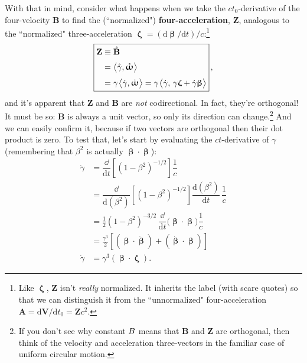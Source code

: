 \documentclass[12pt]{article}
\newcommand{\abs}[1]{\mathnormal \vv{#1}}
\renewcommand{\vv}[1]{\mathbf{#1}}
\newcommand{\dd}[1]{\mathrm{d}#1}
\newcommand{\vvbeta}{\bm{\upbeta}}
\newcommand{\vvomega}{\bm{\upomega}}
\newcommand{\vvzeta}{\bm{\upzeta}}
\begin{document}
With that in mind, consider what happens when we take the $c t_0$-derivative of the four-velocity $\vv B$ to find the (``normalized") \textbf{four-acceleration}, $\vv Z$, analogous to the ``normalized" three-acceleration $\vvzeta=(\dd \vvbeta / \dd t)/c$:\footnote{Like $\vvzeta$, $\vv Z$ isn't \emph{really} normalized. It inherits the label (with scare quotes) so that we can distinguish it from the ``unnormalized" four-acceleration $\vv A = \dd \vv V / \dd t_0 = \vv Z c^2$.}
\begin{equation}\label{eq:34}
\boxed{
\begin{aligned}
\vv Z &\equiv \mathring{\vv B} \\[2pt]
&= \big \langle \mathring{\gamma}, \mathring{\vvomega} \big \rangle \\[3pt]
&= \gamma \mkern1.5mu \big \langle \dot{\gamma}, \dot{\vvomega} \big \rangle = \gamma \mkern1.5mu \big \langle \dot{\gamma}, \, \gamma \vvzeta + \dot{\gamma} \vvbeta \big \rangle
\end{aligned}
} \, ,
\end{equation}
and it's apparent that $\vv Z$ and $\vv B$ are \emph{not} codirectional. In fact, they're orthogonal! It must be so: $\vv B$ is always a unit vector, so only its direction can change.\footnote{If you don't see why constant $\abs B$ means that $\vv B$ and $\vv Z$ are orthogonal, then think of the velocity and acceleration three-vectors in the familiar case of uniform circular motion.} And we can easily confirm it, because if two vectors are orthogonal then their dot product is zero. To test that, let's start by evaluating the $ct$-derivative of $\gamma$ (remembering that $\beta^2$ is actually $\vvbeta \cdot \vvbeta$):
\begin{equation}\label{eq:gd}
\begin{split}
\dot{\gamma} &= \dfrac{\dd}{\dd t} \left[ \left(1-\beta^2 \right)^{-1/2} \right] \dfrac{1}{c} \\[5pt]
&= \dfrac{\dd}{\dd ( \beta^2 )} \left[ \left( 1 - \beta^2 \right)^{-1/2} \right] \dfrac{\dd (\beta^2)}{\dd t} \, \dfrac{1}{c}  \\[5pt]
&= \frac{1}{2} \left( 1 - \beta ^2 \right)^{-3/2} \, \dfrac{\dd}{\dd t} \bigl( \vvbeta \cdot \vvbeta \bigr) \dfrac{1}{c} \\[5pt]
&= \frac{\gamma^3}{2} \left[ ( \vvbeta \cdot \dot{\vvbeta} ) + ( \dot{\vvbeta} \cdot \vvbeta ) \right] \\[5pt]
\dot{\gamma} &= \gamma^3 (\vvbeta \cdot \vvzeta).
\end{split}
\end{equation}
\end{document}
